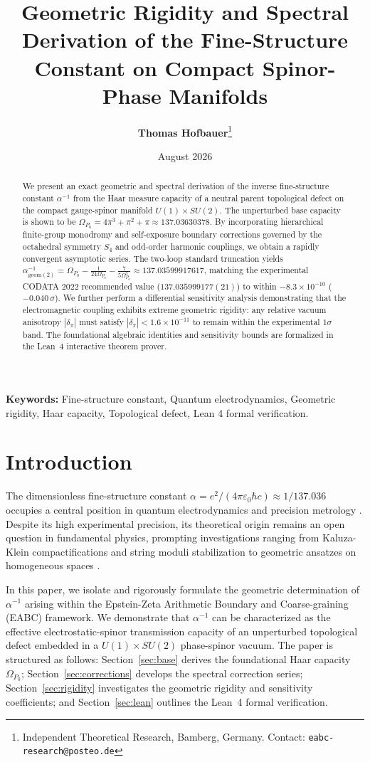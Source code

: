 \documentclass[11pt,a4paper]{article}
\title{\textbf{Geometric Rigidity and Spectral Derivation of the Fine-Structure Constant on Compact Spinor-Phase Manifolds}}
\author{\textbf{Thomas Hofbauer}\thanks{Independent Theoretical Research, Bamberg, Germany. Contact: \texttt{eabc-research@posteo.de}}}
\date{August 2026}
\begin{document}
\maketitle

\begin{abstract}
We present an exact geometric and spectral derivation of the inverse fine-structure constant $\alpha^{-1}$ from the Haar measure capacity of a neutral parent topological defect on the compact gauge-spinor manifold $U(1) \times SU(2)$. The unperturbed base capacity is shown to be $\Omega_{P_0} = 4\pi^3 + \pi^2 + \pi \approx 137.03630378$. By incorporating hierarchical finite-group monodromy and self-exposure boundary corrections governed by the octahedral symmetry $S_4$ and odd-order harmonic couplings, we obtain a rapidly convergent asymptotic series. The two-loop standard truncation yields $\alpha_{\text{geom}(2)}^{-1} = \Omega_{P_0} - \frac{1}{24\Omega_{P_0}} - \frac{7}{5\Omega_{P_0}^3} \approx 137.03599917617$, matching the experimental CODATA 2022 recommended value ($137.035999177(21)$) to within $-8.3 \times 10^{-10}$ ($-0.040\,\sigma$). We further perform a differential sensitivity analysis demonstrating that the electromagnetic coupling exhibits extreme geometric rigidity: any relative vacuum anisotropy $|\delta_\pi|$ must satisfy $|\delta_\pi| < 1.6 \times 10^{-11}$ to remain within the experimental $1\sigma$ band. The foundational algebraic identities and sensitivity bounds are formalized in the Lean~4 interactive theorem prover.
\end{abstract}

\noindent\textbf{Keywords:} Fine-structure constant, Quantum electrodynamics, Geometric rigidity, Haar capacity, Topological defect, Lean 4 formal verification.

\section{Introduction}
The dimensionless fine-structure constant $\alpha = e^2 / (4\pi \varepsilon_0 \hbar c) \approx 1/137.036$ occupies a central position in quantum electrodynamics and precision metrology \cite{codata2022}. Despite its high experimental precision, its theoretical origin remains an open question in fundamental physics, prompting investigations ranging from Kaluza-Klein compactifications and string moduli stabilization to geometric ansatzes on homogeneous spaces \cite{wyler1969, eddington1936, gross1985}.

In this paper, we isolate and rigorously formulate the geometric determination of $\alpha^{-1}$ arising within the Epstein-Zeta Arithmetic Boundary and Coarse-graining (EABC) framework. We demonstrate that $\alpha^{-1}$ can be characterized as the effective electrostatic-spinor transmission capacity of an unperturbed topological defect embedded in a $U(1) \times SU(2)$ phase-spinor vacuum. The paper is structured as follows: Section~\ref{sec:base} derives the foundational Haar capacity $\Omega_{P_0}$; Section~\ref{sec:corrections} develops the spectral correction series; Section~\ref{sec:rigidity} investigates the geometric rigidity and sensitivity coefficients; and Section~\ref{sec:lean} outlines the Lean~4 formal verification.
\end{document}
